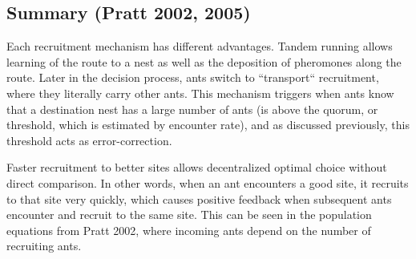 \documentclass{article}
\makeatletter
\def\mcolor#1#{\@mcolor{#1}}
\def\@mcolor#1#2#3{%
  \protect\leavevmode
  \begingroup
    \color#1{#2}#3%
  \endgroup
}
\newcommand{\sitem}[1]
{
    \begin{itemize}
        \item #1
    \end{itemize}
}
\makeatother
\begin{document}


\subsection{Summary (Pratt 2002, 2005)}

Each recruitment mechanism has different advantages. Tandem running allows learning of the route to a nest as well as the deposition of pheromones along the route. 
Later in the decision process, ants switch to ``transport`` recruitment, where they literally carry other ants. 
This mechanism triggers when ants know that a destination nest has a large number of ants (is above the quorum, or threshold, which is estimated by encounter rate), and as discussed previously, this threshold acts as error-correction.

Faster recruitment to better sites allows decentralized optimal choice without direct comparison.
In other words, when an ant encounters a good site, it recruits to that site very quickly, which causes positive feedback when subsequent ants encounter and recruit to the same site.
This can be seen in the population equations from Pratt 2002, where incoming ants depend on the number of recruiting ants.

\end{document}
